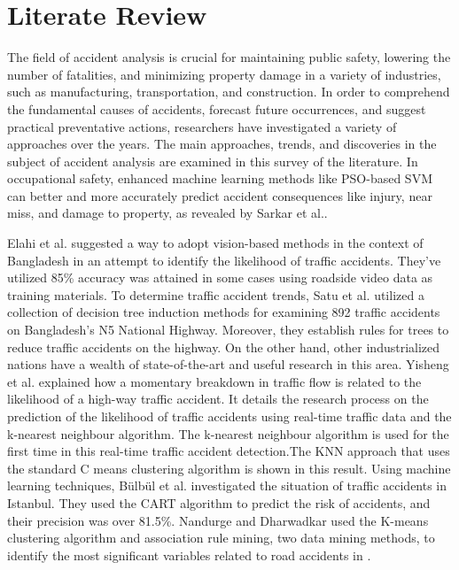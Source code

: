 \documentclass[conference]{IEEEtran}
\begin{document}
\section{Literate Review}
The field of accident analysis is crucial for maintaining public safety, lowering the number of fatalities, and minimizing property damage in a variety of industries, such as manufacturing, transportation, and construction. In order to comprehend the fundamental causes of accidents, forecast future occurrences, and suggest practical preventative actions, researchers have investigated a variety of approaches over the years. The main approaches, trends, and discoveries in the subject of accident analysis are examined in this survey of the literature. In occupational safety, enhanced machine learning methods like PSO-based SVM can better and more accurately predict accident consequences like injury, near miss, and damage to property, as revealed by Sarkar et al.\cite{sarkar2019application}. 

Elahi et al. \cite{elahi2014computer} suggested a way to adopt vision-based methods in the context of Bangladesh in an attempt to identify the likelihood of traffic accidents.  They've utilized 85\% accuracy was attained in some cases using roadside video data as training materials. To determine traffic accident trends, Satu et al. \cite{satu2017mining} utilized a collection of decision tree induction methods for examining 892 traffic accidents on Bangladesh's N5 National Highway.  Moreover, they establish rules for trees to reduce traffic accidents on the highway.  On the other hand, other industrialized nations have a wealth of state-of-the-art and useful research in this area. Yisheng et al. \cite{lv2009real} explained how a momentary breakdown in traffic flow is related to the likelihood of a high-way traffic accident.  It details the research process on the prediction of the likelihood of traffic accidents using real-time traffic data and the k-nearest neighbour algorithm.  The k-nearest neighbour algorithm is used for the first time in this real-time traffic accident detection.The KNN approach that uses the standard C means clustering algorithm is shown in this result. Using machine learning techniques, Bülbül et al. \cite{bulbul2016analysis} investigated the situation of traffic accidents in Istanbul.
They used the CART algorithm to predict the risk of accidents, and their precision was over 81.5\%.  Nandurge and Dharwadkar used the K-means clustering algorithm and association rule mining, two data mining methods, to identify the most significant variables related to road accidents in \cite{nandurge2017analyzing}.
\end{document}
